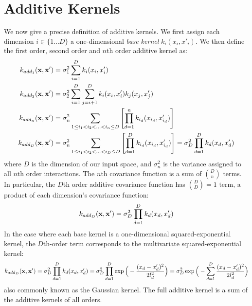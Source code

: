 


\section{Additive Kernels}


We now give a precise definition of additive kernels.
We first assign each dimension $i \in \{1 \dots D\}$ a one-dimensional \emph{base kernel} $k_i(x_i, x'_i)$.
We then define the first order, second order and $n$th order additive kernel as:
%
\begin{align}
k_{add_1}({\bf x, x'}) & = \sigma_1^2 \sum_{i=1}^D k_i(x_i, x_i') \\
k_{add_2}({\bf x, x'}) & = \sigma_2^2 \sum_{i=1}^D \sum_{j = i + 1}^D k_i(x_i, x_i') k_j(x_j, x_j') \\
k_{add_n}({\bf x, x'}) & = \sigma_n^2 \sum_{1 \leq i_1 < i_2 < ... < i_n \leq D} \left[ \prod_{d=1}^n k_{i_d}(x_{i_d}, x_{i_d}') \right] \\
k_{add_D}({\bf x, x'}) & = \sigma_n^2 \sum_{1 \leq i_1 < i_2 < ... < i_D \leq D} \left[ \prod_{d=1}^D k_{i_d}(x_{i_d}, x_{i_d}') \right] = \sigma_D^2 \prod_{d=1}^D k_{d}(x_{d}, x_{d}')
\end{align}
%
where $D$ is the dimension of our input space, and $\sigma_n^2$ is the variance assigned to all $n$th order interactions.
The $n$th covariance function is a sum of ${D \choose n}$ terms.
In particular, the $D$th order additive covariance function has ${D \choose D} = 1$ term, a product of each dimension's covariance function:
%
\begin{align}
k_{add_D}({\bf x, x'}) = \sigma_D^2 \prod_{d=1}^D k_{d}(x_{d}, x_{d}')
\end{align}
%
In the case where each base kernel is a one-dimensional squared-exponential kernel, the $D$th-order term corresponds to the multivariate squared-exponential kernel:
%
\begin{align}
k_{add_D}({\bf x, x'}) = \sigma_D^2 \prod_{d=1}^D k_{d}(x_{d}, x_{d}') = \sigma_D^2 \prod_{d=1}^D \exp \Big( -\frac{ ( x_{d} - x_{d}')^2}{2l^2_d} \Big) = \sigma_D^2  \exp \Big( -\sum_{d=1}^D \frac{ ( x_{d} - x_{d}')^2}{2l^2_d} \Big)
%
\end{align}
also commonly known as the Gaussian kernel.
The full additive kernel is a sum of the additive kernels of all orders.



